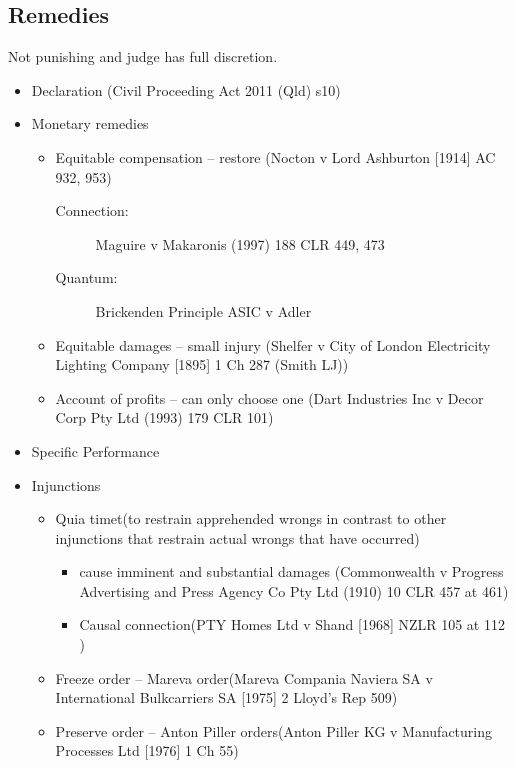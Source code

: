 \subsection*{Remedies}
Not punishing and judge has full discretion. 
\begin{itemize}
    \item Declaration (Civil Proceeding Act 2011 (Qld) s10)
    \item Monetary remedies
        \begin{itemize}
            \item Equitable compensation -- restore (Nocton v Lord Ashburton [1914] AC 932, 953)
                \begin{description}
                    \item[Connection:] Maguire v Makaronis (1997) 188 CLR 449, 473
                    \item[Quantum:]Brickenden Principle ASIC v Adler
                \end{description}
            \item Equitable damages -- small injury (Shelfer v City of London Electricity Lighting Company [1895] 1 Ch
287 (Smith LJ))
            \item Account of profits -- can only choose one (Dart Industries Inc v Decor Corp Pty Ltd (1993) 179 CLR 101)
        \end{itemize}
    \item Specific Performance
    \item Injunctions
        \begin{itemize}
            \item Quia timet(to restrain apprehended wrongs in contrast to other injunctions that restrain actual wrongs that have occurred)
                \begin{itemize}
                    \item cause imminent and substantial damages (Commonwealth v Progress Advertising and Press Agency Co Pty Ltd (1910)
10 CLR 457 at 461)
                    \item Causal connection(PTY Homes Ltd v Shand [1968] NZLR 105 at 112
)
                \end{itemize}
            \item Freeze order -- Mareva order(Mareva
Compania Naviera SA v International Bulkcarriers SA [1975] 2 Lloyd’s
Rep 509) 
            \item Preserve order -- Anton Piller orders(Anton Piller KG v Manufacturing Processes Ltd [1976] 1
Ch 55)
        \end{itemize}
\end{itemize}